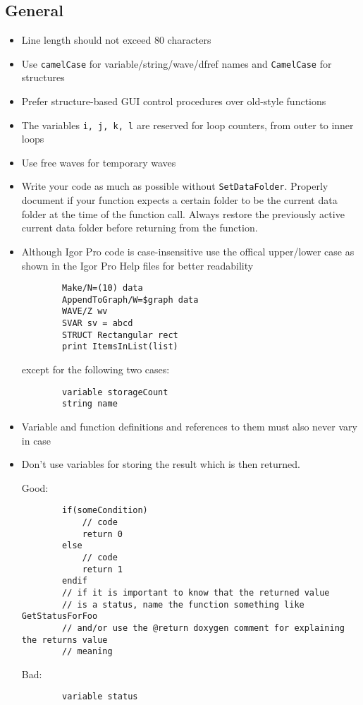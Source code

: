 \documentclass{scrartcl}
\begin{document}
\subsection{General}
%
\begin{itemize}
	\item Line length should not exceed 80 characters
%	
	\item Use \texttt{camelCase} for variable/string/wave/dfref names and \texttt{CamelCase} for structures
%	
	\item Prefer structure-based GUI control procedures over old-style functions
%	
	\item The variables \texttt{i, j, k, l} are reserved for loop counters, from outer to inner loops
%	
	\item Use free waves for temporary waves
%	
	\item Write your code as much as possible without \texttt{SetDataFolder}. Properly document if your function expects 
	      a certain folder to be the current data folder at the time of the function call. Always restore the previously active current data folder
	      before returning from the function.
%	      
	\item Although Igor Pro code is case-insensitive use the offical upper/lower case as shown in the Igor Pro Help files for better readability
	\begin{verbatim}
		Make/N=(10) data
		AppendToGraph/W=$graph data
		WAVE/Z wv
		SVAR sv = abcd
		STRUCT Rectangular rect
		print ItemsInList(list)
	\end{verbatim}
	except for the following two cases:
	\begin{verbatim}
		variable storageCount
		string name
	\end{verbatim}
%
	\item Variable and function definitions and references to them must also never vary in case
%
	\item Don't use variables for storing the result which is then returned.\par
	Good: 
	\begin{verbatim}
		if(someCondition)
			// code
			return 0
		else
			// code
			return 1
		endif
		// if it is important to know that the returned value
		// is a status, name the function something like GetStatusForFoo 
		// and/or use the @return doxygen comment for explaining the returns value
		// meaning
	\end{verbatim}
	\begin{minipage}{\textwidth}
	Bad: 
	\begin{verbatim}
		variable status
		

\end{verbatim}
\end{minipage}
\end{itemize}
\end{document}
